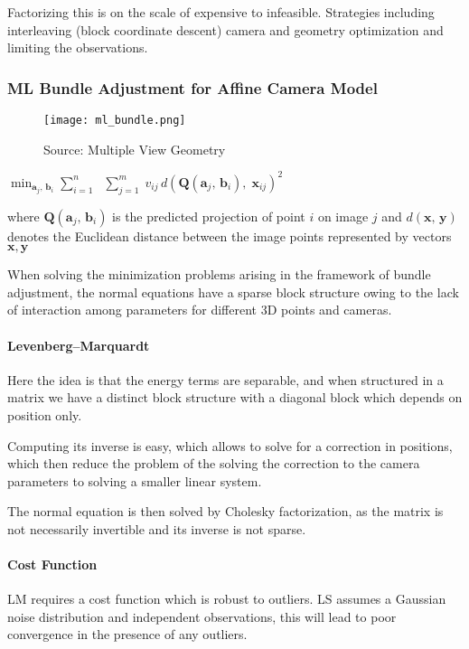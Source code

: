 Factorizing this is on the scale of expensive to infeasible. Strategies including interleaving (block coordinate descent) camera and geometry optimization and limiting the observations.

\subsubsection{ML Bundle Adjustment for Affine Camera Model}

\begin{figure}[h]
\texttt{[image: ml\_bundle.png]}
\caption{Source: Multiple View Geometry}
\end{figure}

$\min _{{{\mathbf  {a}}_{j},\,{\mathbf  {b}}_{i}}} \sum _{{i=1}}^{{n}}\; $
$ \sum _{{j=1}}^{{m}}\;v_{{ij}}\,d({\mathbf  {Q}}({\mathbf  {a}}_{j},\,{\mathbf  {b}}_{i}),\;{\mathbf{x}}_{{ij}})^{2}$

where $\mathbf {Q} (\mathbf {a} _{j},\,\mathbf {b} _{i})$ is the predicted projection of point $i$ on image $j$ and $d(\mathbf {x} ,\,\mathbf {y} )$  denotes the Euclidean distance between the image points represented by vectors $\mathbf{x,y}$

When solving the minimization problems arising in the framework of bundle adjustment, the normal equations have a sparse block structure owing to the lack of interaction among parameters for different 3D points and cameras.

\paragraph{Levenberg–Marquardt}

Here the idea is that the energy terms are separable, and when structured in a matrix we have a distinct block structure with a diagonal block which depends on position only. 

Computing its inverse is easy, which allows to solve for a correction in positions, which then reduce the problem of the solving the correction to the camera parameters to solving a smaller linear system.

The normal equation is then solved by Cholesky factorization, as the matrix is not necessarily invertible and its inverse is not sparse.

\paragraph{Cost Function}
LM requires a cost function which is robust to outliers. 
LS assumes a Gaussian noise distribution and independent observations, this will lead to poor convergence in the presence of any outliers. 

